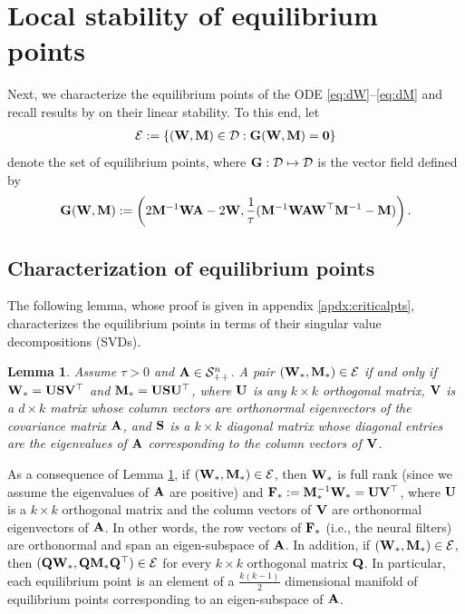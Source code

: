 \documentclass[11pt]{article}
\newtheorem{lemma}{Lemma}
\theoremstyle{definition}
\newcommand{\A}{{\bf A}}
\newcommand{\F}{{\bf F}}
\newcommand{\G}{{\bf G}}
\newcommand{\M}{{\bf M}}
\newcommand{\Q}{{\bf Q}}
\renewcommand{\S}{{\bf S}}
\newcommand{\U}{{\bf U}}
\newcommand{\V}{{\bf V}}
\newcommand{\W}{{\bf W}}
\newcommand{\calD}{\mathcal{D}}
\newcommand{\calE}{\mathcal{E}}
\newcommand{\calS}{\mathcal{S}}
\begin{document}
\section{Local stability of equilibrium points}\label{sec:local}

Next, we characterize the equilibrium points of the ODE \eqref{eq:dW}--\eqref{eq:dM} and recall results by \citet{pehlevan2018similarity} on their linear stability. To this end, let 
\begin{align*}
    \calE:=\{(\W,\M)\in\calD:\G(\W,\M)={\bf 0}\}    
\end{align*}
denote the set of equilibrium points, where $\G:\calD\mapsto\calD$ is the vector field defined by
\begin{align*}
    \G(\W,\M):=\left(2\M^{-1}\W\A-2\W,\frac1\tau(\M^{-1}\W\A\W^\top\M^{-1}-\M)\right).
\end{align*}

\subsection{Characterization of equilibrium points}

The following lemma, whose proof is given in appendix \ref{apdx:criticalpts}, characterizes the equilibrium points in terms of their singular value decompositions (SVDs).

\begin{lemma}\label{lem:criticalpts}
    Assume $\tau>0$ and $\A\in\calS_{++}^n$.  A pair $(\W_\ast,\M_\ast)\in\calE$ if and only if $\W_\ast=\U\S\V^\top$ and $\M_\ast=\U\S\U^\top$, where $\U$ is any $k\times k$ orthogonal matrix, $\V$ is a $d\times k$ matrix whose column vectors are orthonormal eigenvectors of the covariance matrix $\A$, and $\S$ is a $k\times k$ diagonal matrix whose diagonal entries are the eigenvalues of $\A$ corresponding to the column vectors of $\V$.
\end{lemma}

As a consequence of Lemma \ref{lem:criticalpts}, if $(\W_\ast,\M_\ast)\in\calE$, then $\W_\ast$ is full rank (since we assume the eigenvalues of $\A$ are positive) and $\F_\ast:=\M_\ast^{-1}\W_\ast=\U\V^\top$, where $\U$ is a $k\times k$ orthogonal matrix and the column vectors of $\V$ are orthonormal eigenvectors of $\A$. In other words, the row vectors of $\F_\ast$ (i.e., the neural filters) are orthonormal and span an eigen-subspace of $\A$.
In addition, if $(\W_\ast,\M_\ast)\in\calE$, then $(\Q\W_\ast,\Q\M_\ast\Q^\top)\in\calE$ for every $k\times k$ orthogonal matrix $\Q$. In particular, each equilibrium point is an element of a $\frac{k(k-1)}{2}$ dimensional manifold of equilibrium points corresponding to an eigen-subspace of $\A$.
\end{document}
